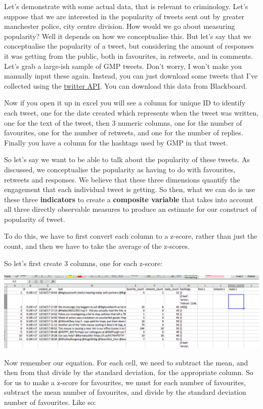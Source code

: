 \documentclass[]{book}
\theoremstyle{definition}
\theoremstyle{definition}
\theoremstyle{definition}
\theoremstyle{remark}
\begin{document}
Let's demonstrate with some actual data, that is relevant to
criminology. Let's suppose that we are interested in the popularity of
tweets sent out by greater manchester police, city centre division. How
would we go about measuring popularity? Well it depends on how we
conceptualise this. But let's say that we conceptualise the popularity
of a tweet, but considering the amount of responses it was getting from
the public, both in favourites, in retweets, and in comments. Let's grab
a large-ish sample of GMP tweets. Don't worry, I won't make you manually
input these again. Instead, you can just download some tweets that I've
collected using the \href{https://developer.twitter.com/en/docs}{twitter
API}. You can download this data from Blackboard.

Now if you open it up in excel you will see a column for unique ID to
identify each tweet, one for the date created which represents when the
tweet was written, one for the text of the tweet, then 3 numeric
columns, one for the number of favourites, one for the number of
retweets, and one for the number of replies. Finally you have a column
for the hashtags used by GMP in that tweet.

So let's say we want to be able to talk about the popularity of these
tweets. As discussed, we conceptualise the popularity as having to do
with favourites, retweets and responses. We believe that these three
dimensions quantify the engagement that each individual tweet is
getting. So then, what we can do is use these three \textbf{indicators}
to create a \textbf{composite variable} that takes into account all
three directly observable measures to produce an estimate for our
construct of popularity of tweet.

To do this, we have to first convert each column to a z-score, rather
than just the count, and then we have to take the average of the
z-scores.

So let's first create 3 columns, one for each z-score:

\includegraphics{imgs/z-cols_created.png}

Now remember our equation. For each cell, we need to subtract the mean,
and then from that divide by the standard deviation, for the appropriate
column. So for us to make a z-score for favourites, we must for each
number of favourites, subtract the mean number of favourites, and divide
by the standard deviation number of favourites. Like so:
\end{document}
